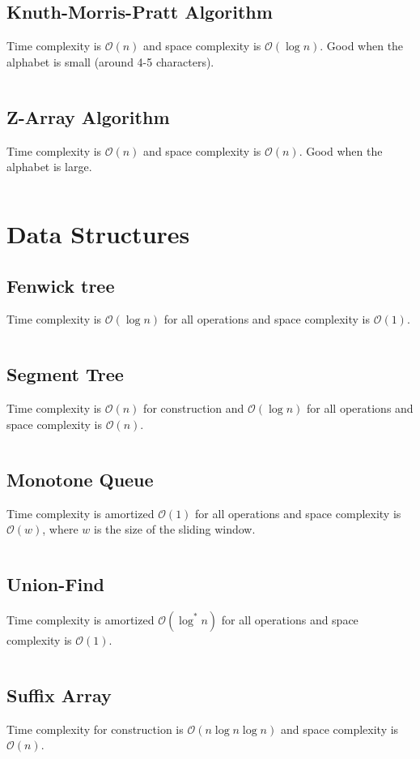 \documentclass[8pt,a4paper,landscape,oneside]{amsart}
\newcommand{\code}[1]{\inputminted[fontsize=\normalsize,baselinestretch=1]{java}{code/#1}}
\newcommand{\bigO}{\mathcal{O}}
\begin{document}
\begin{multicols*}{3}
  \subsection{Knuth-Morris-Pratt Algorithm}
  Time complexity is $\bigO(n)$ and space complexity is $\bigO(\log n)$. Good when the alphabet is small (around 4-5 characters).
  \code{Structures/KMP.java}
  
  \subsection{Z-Array Algorithm}
  Time complexity is $\bigO(n)$ and space complexity is $\bigO(n)$. Good when the alphabet is large.
  \code{Structures/ZArray.java}
  
  
\section{Data Structures}
  \subsection{Fenwick tree}
  Time complexity is $\bigO(\log n)$ for all operations and space complexity is $\bigO(1)$.
  \code{Structures/Fenwick.java}
  
  \subsection{Segment Tree}
  Time complexity is $\bigO(n)$ for construction and $\bigO(\log n)$ for all operations and space complexity is $\bigO(n)$.
  \code{Structures/SegmentTreeRMQ.java}
  
  \subsection{Monotone Queue}
  Time complexity is amortized $\bigO(1)$ for all operations and space complexity is $\bigO(w)$, where $w$ is the size of the sliding window.
  \code{Structures/MinMonoQueue.java}
  
  \subsection{Union-Find}
  Time complexity is amortized $\bigO(\log^*{n})$ for all operations and space complexity is $\bigO(1)$.
  \code{Structures/UnionFind.java}
  
  \subsection{Suffix Array}
  Time complexity for construction is $\bigO(n\log{n}\log{n})$ and space complexity is $\bigO(n)$.
  \code{Structures/SuffixArray.java}
  

\end{multicols*}
\end{document}

